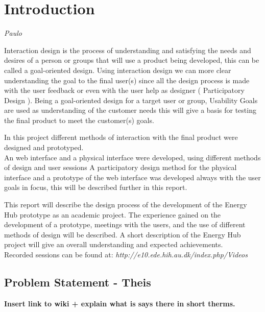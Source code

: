 \chapter{Introduction}

\textit{Paulo}

Interaction design is the process of understanding and satisfying the needs and desires of a person or groups that will use a product being developed, this can be called a goal-oriented design. Using interaction design we can more clear understanding the goal to the final user(s) since all the design process is made with the user feedback or even with the user help as designer ( Participatory Design ). Being a goal-oriented design for a target user or group, Usability Goals are used as understanding of the customer needs this will give a basis for testing the final product to meet the customer(s) goals.

In this project different methods of interaction with the final product were designed and prototyped.\\
An web interface and a physical interface were developed, using different methods of design and user sessions A participatory design method for the physical interface and a prototype of the web interface was developed always with the user goals in focus, this will be described further in this report.

This report will describe the design process of the development of the Energy Hub prototype as an academic project. The experience gained on the development of a prototype, meetings with the users, and the use of different methods of design will be described. A short description of the Energy Hub project will give an overall understanding and expected achievements.\\

Recorded sessions can be found at: \textit{http://e10.ede.hih.au.dk/index.php/Videos}
\section{Problem Statement - Theis}
\textbf{Insert link to wiki + explain what is says there in short therms.}


